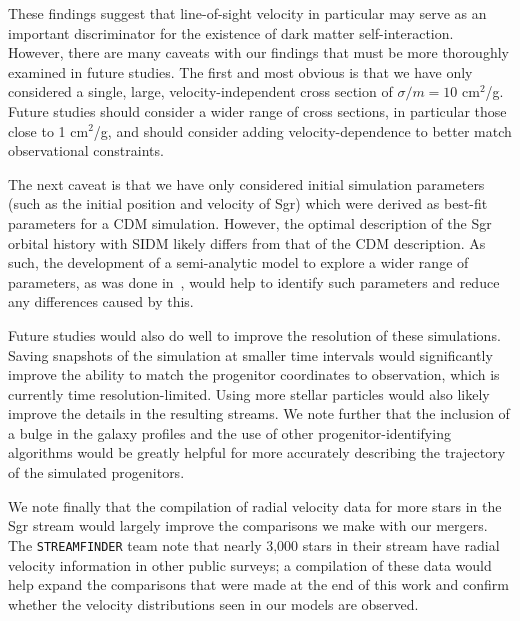 These findings suggest that line-of-sight velocity in particular may serve as
an important discriminator for the existence of dark matter self-interaction.
However, there are many caveats with our findings that must be more thoroughly
examined in future studies. The first and most obvious is that we have only
considered a single, large, velocity-independent cross section of $\sigma / m =
10$ cm$^2$/g. Future studies should consider a wider range of cross sections, in
particular those close to 1 cm$^2$/g, and should consider adding
velocity-dependence to better match observational constraints. 

The next caveat is that we have only considered initial simulation parameters
(such as the initial position and velocity of Sgr) which were derived as
best-fit parameters for a CDM simulation. However, the optimal description of
the Sgr orbital history with SIDM likely differs from that of the CDM
description.  As such, the development of a semi-analytic model to explore a
wider range of parameters, as was done in~\cite{dierickx_predicted_2017}, would
help to identify such parameters and reduce any differences caused by this.

Future studies would also do well to improve the resolution of these
simulations.  Saving snapshots of the simulation at smaller time intervals
would significantly improve the ability to match the progenitor coordinates to
observation, which is currently time resolution-limited.  Using more stellar
particles would also likely improve the details in the resulting streams.  We
note further that the inclusion of a bulge in the galaxy profiles and the use
of other progenitor-identifying algorithms would be greatly helpful for more
accurately describing the trajectory of the simulated progenitors.

We note finally that the compilation of radial velocity data for more stars in
the Sgr stream would largely improve the comparisons we make with our mergers.
The \verb|STREAMFINDER| team note that nearly 3,000 stars in their stream have
radial velocity information in other public surveys; a compilation of these
data would help expand the comparisons that were made at the end of this work
and confirm whether the velocity distributions seen in our models are
observed.
